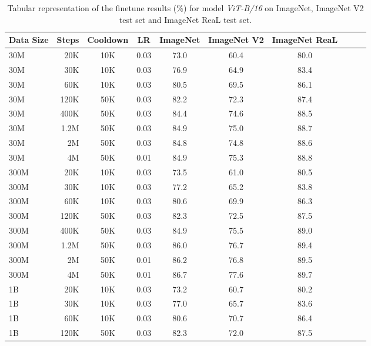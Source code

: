 \begin{table}[h]
  \setlength{\tabcolsep}{5pt}
  \setlength{\extrarowheight}{5pt}
  \renewcommand{\arraystretch}{0.75}
  \centering
  \caption{Tabular representation of the finetune results (\%) for model \emph{ViT-B/16} on ImageNet, ImageNet V2 test set and ImageNet ReaL test set.}\label{tbl:b_16_ft}
  \begin{tabulary}{1.0\textwidth}{l r c c c c c c c c}
    \toprule[1pt]
    \bf{Data Size} & \bf{Steps} & \bf{Cooldown} & \bf{LR} & \bf{ImageNet} & \bf{ImageNet V2} & \bf{ImageNet ReaL} \\
    \midrule
30M   & 20K   & 10K   & 0.03 & 73.0 & 60.4 & 80.0 \\
30M   & 30K   & 10K   & 0.03 & 76.9 & 64.9 & 83.4 \\
30M   & 60K   & 10K   & 0.03 & 80.5 & 69.5 & 86.1 \\
30M   & 120K  & 50K   & 0.03 & 82.2 & 72.3 & 87.4 \\
30M   & 400K  & 50K   & 0.03 & 84.4 & 74.6 & 88.5 \\
30M   & 1.2M  & 50K   & 0.03 & 84.9 & 75.0 & 88.7 \\
30M   & 2M    & 50K   & 0.03 & 84.8 & 74.8 & 88.6 \\
30M   & 4M    & 50K   & 0.01 & 84.9 & 75.3 & 88.8 \\
\midrule[0.25pt]
300M  & 20K   & 10K   & 0.03 & 73.5 & 61.0 & 80.5 \\
300M  & 30K   & 10K   & 0.03 & 77.2 & 65.2 & 83.8 \\
300M  & 60K   & 10K   & 0.03 & 80.6 & 69.9 & 86.3 \\
300M  & 120K  & 50K   & 0.03 & 82.3 & 72.5 & 87.5 \\
300M  & 400K  & 50K   & 0.03 & 84.9 & 75.5 & 89.0 \\
300M  & 1.2M  & 50K   & 0.03 & 86.0 & 76.7 & 89.4 \\
300M  & 2M    & 50K   & 0.01 & 86.2 & 76.8 & 89.5 \\
300M  & 4M    & 50K   & 0.01 & 86.7 & 77.6 & 89.7 \\
\midrule[0.25pt]
1B    & 20K   & 10K   & 0.03 & 73.2 & 60.7 & 80.2 \\
1B    & 30K   & 10K   & 0.03 & 77.0 & 65.7 & 83.6 \\
1B    & 60K   & 10K   & 0.03 & 80.6 & 70.7 & 86.4 \\
1B    & 120K  & 50K   & 0.03 & 82.3 & 72.0 & 87.5 \\

\end{tabulary}
\end{table}
